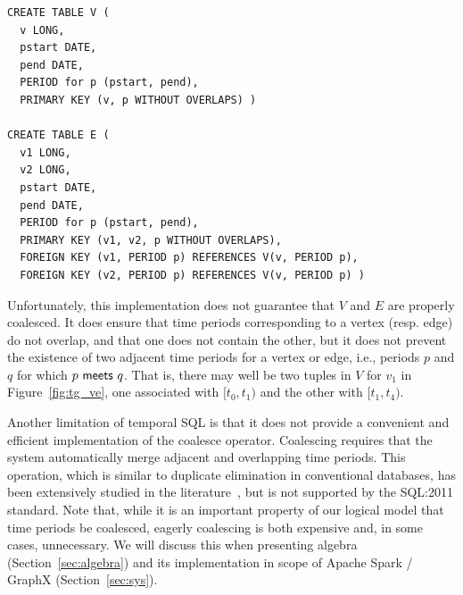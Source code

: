 
\begin{small}
\begin{verbatim}
CREATE TABLE V (
  v LONG,
  pstart DATE,
  pend DATE,
  PERIOD for p (pstart, pend),
  PRIMARY KEY (v, p WITHOUT OVERLAPS) )

CREATE TABLE E (
  v1 LONG,
  v2 LONG,
  pstart DATE,
  pend DATE,
  PERIOD for p (pstart, pend),
  PRIMARY KEY (v1, v2, p WITHOUT OVERLAPS),
  FOREIGN KEY (v1, PERIOD p) REFERENCES V(v, PERIOD p),
  FOREIGN KEY (v2, PERIOD p) REFERENCES V(v, PERIOD p) )
\end{verbatim}
\end{small}

Unfortunately, this implementation does not guarantee that $V$ and $E$
are properly coalesced.  It does ensure that time periods
corresponding to a vertex (resp. edge) do not overlap, and that one
does not contain the other, but it does not prevent the existence of
two adjacent time periods for a vertex or edge, i.e., periods $p$ and
$q$ for which $p~\mathsf{meets}~q$.  That is, there may well be two
tuples in $V$ for $v_1$ in Figure~\ref{fig:tg_ve}, one associated with
$[t_0,t_1)$ and the other with $[t_1,t_4)$.

Another limitation of temporal SQL is that it does not provide a
convenient and efficient implementation of the coalesce operator.
Coalescing requires that the system automatically merge adjacent and
overlapping time periods.  This operation, which is similar to
duplicate elimination in conventional databases, has been extensively
studied in the
literature~\cite{DBLP:conf/vldb/BohlenSS96,DBLP:journals/sigmod/Zimanyi06},
but is not supported by the SQL:2011 standard.  Note that, while it is
an important property of our logical model that time periods be
coalesced, eagerly coalescing is both expensive and, in some cases,
unnecessary.  We will discuss this when presenting \tg algebra
(Section~\ref{sec:algebra}) and its implementation in scope of Apache
Spark / GraphX (Section~\ref{sec:sys}).

